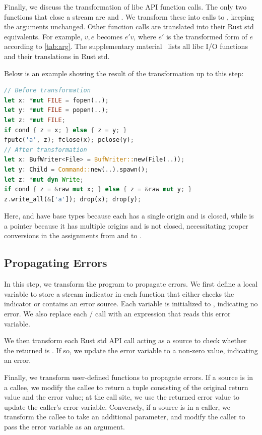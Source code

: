 Finally, we discuss the transformation of libc API function calls.
%
The only two functions that close a stream are  and .
%
We transform these into calls to , keeping the arguments unchanged.
%
Other function calls are translated into their Rust std equivalents.
%
For example, $v, e$\C{)} becomes $e'$\C{.write\_all(\&[}$v$\C{])}, where
$e'$ is the transformed form of $e$ according to \cref{tab:arg}.
%
The supplementary material~\cite{supp} lists all libc I/O functions and their
translations in Rust std.

Below is an example showing the result of the transformation up to this step:

\begin{lstlisting}[language=Rust]
// Before transformation
let x: *mut FILE = fopen(..);
let y: *mut FILE = popen(..);
let z: *mut FILE;
if cond { z = x; } else { z = y; }
fputc('a', z); fclose(x); pclose(y);
// After transformation
let x: BufWriter<File> = BufWriter::new(File(..));
let y: Child = Command::new(..).spawn();
let z: *mut dyn Write;
if cond { z = &raw mut x; } else { z = &raw mut y; }
z.write_all(&['a']); drop(x); drop(y);
\end{lstlisting}

\noindent
%
Here,  and  have base types because each has a single origin and is
closed, while  is a  pointer because it has multiple origins and is
not closed, necessitating proper conversions in the assignments from  and
 to .

\subsection{Propagating Errors}
\label{sec:transformation:errors}

In this step, we transform the program to propagate errors.
%
We first define a local variable to store a stream indicator in each function
that either checks the indicator or contains an error source.
%
Each variable is initialized to , indicating no error.
%
We also replace each / call with an expression that reads this
error variable.

We then transform each Rust std API call acting as a source to check whether the
returned  is .
%
If so, we update the error variable to a non-zero value, indicating an error.

Finally, we transform user-defined functions to propagate errors.
%
If a source is in a callee, we modify the callee to return a tuple consisting of
the original return value and the error value;
%
at the call site, we use the returned error value to update the caller's error
variable.
%
Conversely, if a source is in a caller, we transform the callee to take an
additional parameter, and modify the caller to pass the error variable as an
argument.

